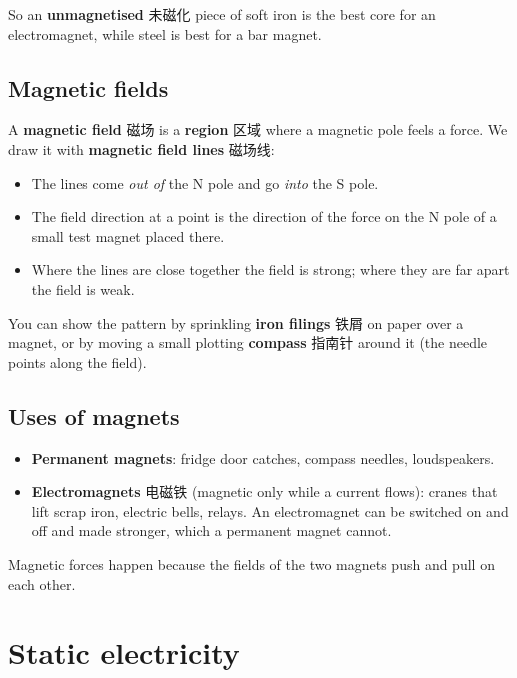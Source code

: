 \documentclass[11pt]{article}
\begin{document}
So an \textbf{unmagnetised} 未磁化 piece of soft iron is the best core for an electromagnet, while steel is best for a bar magnet.

\subsection*{Magnetic fields}

A \textbf{magnetic field} 磁场 is a \textbf{region} 区域 where a magnetic pole feels a force. We draw it with \textbf{magnetic field lines} 磁场线:

\begin{itemize}
\item The lines come \emph{out of} the N pole and go \emph{into} the S pole.

\item The field direction at a point is the direction of the force on the N pole of a small test magnet placed there.

\item Where the lines are close together the field is strong; where they are far apart the field is weak.

\end{itemize}

You can show the pattern by sprinkling \textbf{iron filings} 铁屑 on paper over a magnet, or by moving a small plotting \textbf{compass} 指南针 around it (the needle points along the field).

\subsection*{Uses of magnets}

\begin{itemize}
\item \textbf{Permanent magnets}: fridge door catches, compass needles, loudspeakers.

\item \textbf{Electromagnets} 电磁铁 (magnetic only while a current flows): cranes that lift scrap iron, electric bells, relays. An electromagnet can be switched on and off and made stronger, which a permanent magnet cannot.

\end{itemize}

Magnetic forces happen because the fields of the two magnets push and pull on each other.

\section*{Static electricity}
\end{document}
